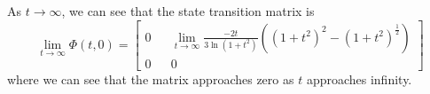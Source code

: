 As \( t \rightarrow \infty \), we can see that the state transition matrix is
\begin{equation*}
    \lim_{t \rightarrow \infty} \Phi(t, 0)
    =
    \begin{bmatrix}
        0
        & &
        \lim_{t \rightarrow \infty}
        \frac{-2t}{3\ln(1+t^2)} \left( {(1+t^2)}^{2} - {(1+t^2)}^{\frac{1}{2}} \right)
        \\
        0
        & &
        0
    \end{bmatrix}
\end{equation*}
where we can see that the matrix approaches zero as \(t\) approaches infinity.
